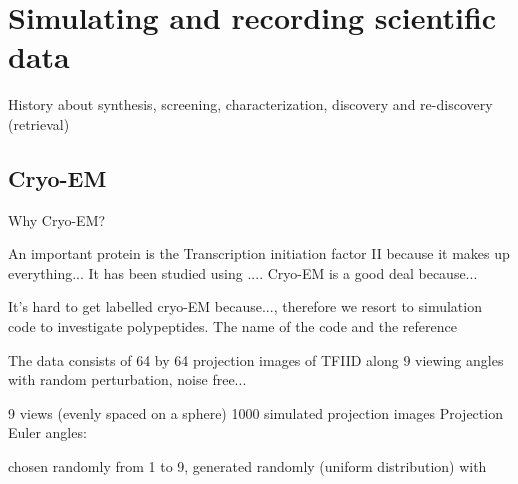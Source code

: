 \section{Simulating and recording scientific data}\label{sec:mat}
History about synthesis, screening, characterization, discovery and re-discovery (retrieval)



\subsection{Cryo-EM}\label{subsec:cryo}
Why Cryo-EM?

An important protein is the Transcription initiation factor II because it makes up everything... It has been studied using .... Cryo-EM is a good deal because...

It's hard to get labelled cryo-EM because..., therefore we resort to simulation code to investigate polypeptides. The name of the code and the reference

The data consists of 64 by 64 projection images of TFIID along 9 viewing angles with random perturbation, noise free...

9 views (evenly spaced on a sphere)
1000 simulated projection images
Projection Euler angles:

chosen randomly from 1 to 9,  generated randomly (uniform distribution) with

